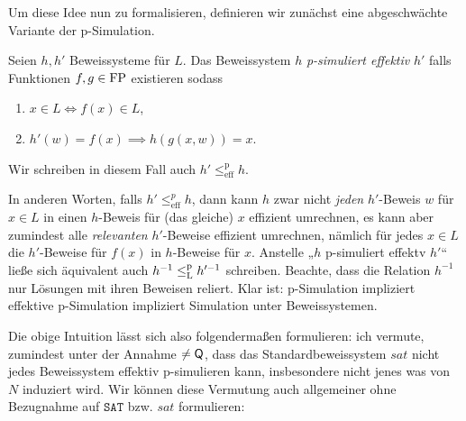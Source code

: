 Um diese Idee nun zu formalisieren, definieren wir zunächst eine abgeschwächte Variante der p-Simulation.
\begin{definition}
    Seien $h,h'$ Beweissysteme für $L$. Das Beweissystem $h$ \emph{p-simuliert effektiv} $h'$ falls Funktionen $f,g\in\mathrm{FP}$ existieren sodass
    \begin{enumerate}
        \item $x\in L \iff f(x)\in L$,
        \item $ h'(w)=f(x) \implies h(g(x, w)) = x. $
    \end{enumerate}
    Wir schreiben in diesem Fall auch $h'\leq^\mathrm p_\mathrm{eff} h$. %
\end{definition}
In anderen Worten, falls $h'\leq^p_\mathrm{eff} h$, dann kann $h$ zwar nicht \emph{jeden} $h'$-Beweis $w$ für $x\in L$ in einen $h$-Beweis für (das gleiche) $x$ effizient umrechnen, es kann aber zumindest alle \emph{relevanten} $h'$-Beweise effizient umrechnen, nämlich für jedes $x\in L$ die $h'$-Beweise für $f(x)$ in $h$-Beweise für $x$.
Anstelle „$h$ p-simuliert effektv $h'$“ ließe sich äquivalent auch $h^{-1}\leq_\mathrm{L}^\mathrm{p} h'^{-1}$ schreiben. Beachte, dass die Relation $h^{-1}$ nur Lösungen mit ihren Beweisen reliert.
Klar ist: p-Simulation impliziert effektive p-Simulation impliziert Simulation unter Beweissystemen.

Die obige Intuition lässt sich also folgendermaßen formulieren: ich vermute, zumindest unter der Annahme $\neq\mathsf{Q}$, dass das Standardbeweissystem $\mathit{sat}$ nicht jedes Beweissystem effektiv p-simulieren kann, insbesondere nicht jenes was von $N$ induziert wird.
Wir können diese Vermutung auch allgemeiner ohne Bezugnahme auf $\mathtt{SAT}$ bzw. $\mathit{sat}$ formulieren:

